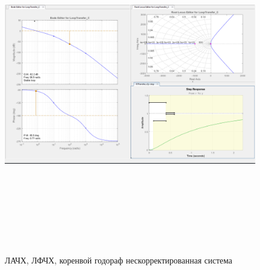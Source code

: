 \documentclass[a4paper,12pt]{article}
\begin{document}
\begin{landscape}
\begin{figure}[h]
    \centering
    \includegraphics[height=15cm]{img/uncompensated.PNG}
    \caption{ЛАЧХ, ЛФЧХ, коренвой годораф нескорректированная система}
    \label{fig:my_label}
\end{figure}
\end{landscape}
\end{document}
